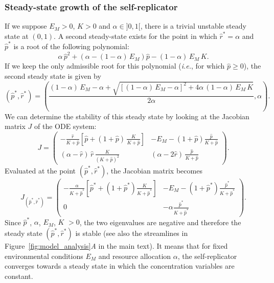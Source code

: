 \subsubsection{Steady-state growth of the self-replicator}
\label{si::growthrate}

If we suppose $E_M > 0$, $K > 0$ and $\alpha \in ]0, 1[$, there is a trivial unstable steady state at $(0, 1)$.
A second steady-state exists for the point in which $\hat{r}^* = \alpha$ and $\hat{p}^*$ is a root of the following polynomial:
\[
\alpha \, \hat{p}^2 + \left(\alpha - (1-\alpha) \, E_M \right) \hat{p} - (1-\alpha)\, E_M\, K.
\]
If we keep the only admissible root for this polynomial (\textit{i.e.}, for which $\hat{p} \geq 0$), the second steady state is given by
\begin{equation}
\label{eq:supp_steadystate}
(\hat{p}^*, \hat{r}^*) = \left( \frac{(1-\alpha)\, E_M - \alpha + \sqrt{[(1-\alpha)\, E_M - \alpha]^2 + 4\alpha\, (1-\alpha)\, E_M\, K}}{2\alpha}, \alpha \right).
\end{equation}
We can determine the stability of this steady state by looking at the Jacobian matrix $J$ of the ODE system:
\begin{equation}
\label{eq:supp_jacop}
J = \left(\begin{matrix}
- \frac{\hat{r}}{K + \hat{p}} \left[ \hat{p} + (1+\hat{p})\, \frac{K}{K+\hat{p}}\right] & - E_M - (1+\hat{p})\frac{\hat{p}}{K+\hat{p}}\\
(\alpha - \hat{r})\, \hat{r} \, \frac{K}{(K+\hat{p})^2} & (\alpha - 2\hat{r})\, \frac{\hat{p}}{K+\hat{p}}
\end{matrix}\right) .
\end{equation}
Evaluated at the point $(\hat{p}^*, \hat{r}^*)$, the Jacobian matrix becomes
\[
J_{(\hat{p}^*, \hat{r}^*)} = \left(\begin{matrix}
- \frac{\alpha}{K + \hat{p}^*} \left[ \hat{p}^* + (1+\hat{p}^*)\frac{K}{K+\hat{p}^*}\right] & - E_M - (1+\hat{p}^*)\frac{\hat{p}^*}{K+\hat{p}^*}\\
0 & -\alpha\frac{\hat{p}^*}{K+\hat{p}^*}
\end{matrix}\right).
\]
Since $\hat{p}^*$, $\alpha$, $E_M$, $K$ $>0$, the two eigenvalues are negative and therefore the steady state $(\hat{p}^*, \hat{r}^*)$ is stable (see also the streamlines in Figure~\ref{fig:model_analysis}\textit{A} in the main text).
It means that for fixed environmental conditions $E_M$ and resource allocation $\alpha$, the self-replicator converges towards a steady state in which the concentration variables are constant.

